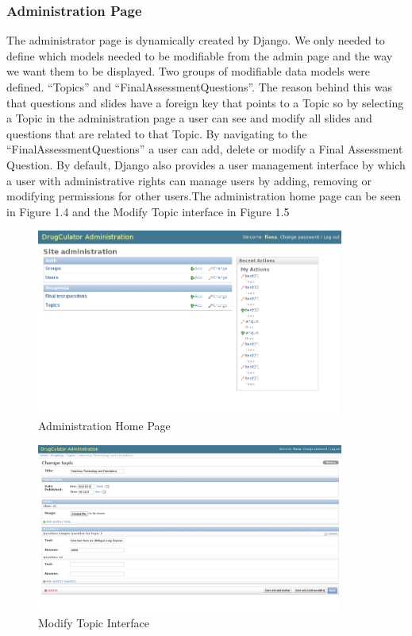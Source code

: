 \documentclass{l3proj}
\begin{document}
{\subsubsection{Administration Page}
The administrator page is dynamically created by Django. We only needed to define which models needed to be modifiable from the admin page and the  way we want them to be displayed.  Two groups of modifiable data models were defined. “Topics” and “FinalAssessmentQuestions”. The reason behind this was that questions and slides have a foreign key that points to a Topic so by selecting a Topic in the administration page a user can see and modify all slides and questions that are related to that Topic. By navigating to the “FinalAssessmentQuestions” a user can add, delete or modify a Final Assessment Question. By default, Django also provides a user management interface by which  a user with administrative rights can manage users by adding, removing or modifying permissions for other users.The administration home page can be seen in Figure 1.4 and the Modify Topic interface in Figure 1.5
\begin{figure}[!htb]
\caption{Administration Home Page}
 \centering
\includegraphics[width=0.9\textwidth]{images/adminPage.png}
\end{figure}

\begin{figure}[!htb]
\caption{Modify Topic Interface}
 \centering
\includegraphics[width=0.9\textwidth]{images/adminTopic.png}
\end{figure}

}
\end{document}
